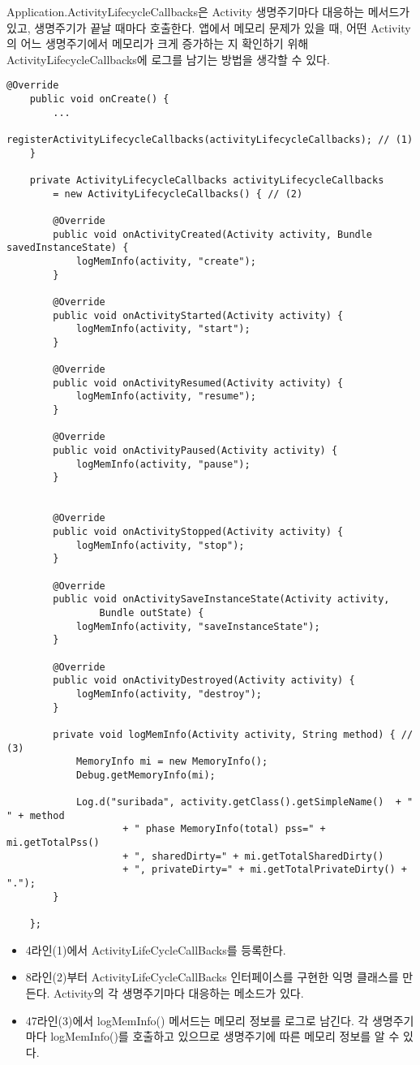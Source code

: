 Application.ActivityLifecycleCallbacks은 Activity 생명주기마다 대응하는 메서드가 있고, 생명주기가 끝날 때마다 호출한다.
앱에서 메모리 문제가 있을 때, 어떤 Activity의 어느 생명주기에서 메모리가 크게 증가하는 지 확인하기 위해 ActivityLifecycleCallbacks에 로그를 남기는 방법을 생각할 수 있다.
\begin{lstlisting}[frame=single] 
	@Override
	public void onCreate() {
		...
		registerActivityLifecycleCallbacks(activityLifecycleCallbacks); // (1)
	}
	
	private ActivityLifecycleCallbacks activityLifecycleCallbacks 
		= new ActivityLifecycleCallbacks() { // (2)
		
		@Override
		public void onActivityCreated(Activity activity, Bundle savedInstanceState) {
			logMemInfo(activity, "create");
		}
		
		@Override
		public void onActivityStarted(Activity activity) {
			logMemInfo(activity, "start");
		}
		
		@Override
		public void onActivityResumed(Activity activity) {
			logMemInfo(activity, "resume");
		}
		
		@Override
		public void onActivityPaused(Activity activity) {
			logMemInfo(activity, "pause");
		}

		
		@Override
		public void onActivityStopped(Activity activity) {
			logMemInfo(activity, "stop");
		}
		
		@Override
		public void onActivitySaveInstanceState(Activity activity, 
				Bundle outState) {
			logMemInfo(activity, "saveInstanceState");
		}
		
		@Override
		public void onActivityDestroyed(Activity activity) {
			logMemInfo(activity, "destroy");
		}
		
		private void logMemInfo(Activity activity, String method) { // (3)
			MemoryInfo mi = new MemoryInfo(); 
			Debug.getMemoryInfo(mi);
			
			Log.d("suribada", activity.getClass().getSimpleName()  + " " + method 
					+ " phase MemoryInfo(total) pss=" + mi.getTotalPss() 
					+ ", sharedDirty=" + mi.getTotalSharedDirty() 
					+ ", privateDirty=" + mi.getTotalPrivateDirty() + "."); 
		}
	
	};
\end{lstlisting}
\begin{itemize}
\item 4라인(1)에서 ActivityLifeCycleCallBacks를 등록한다.
\item 8라인(2)부터 ActivityLifeCycleCallBacks 인터페이스를 구현한 익명 클래스를 만든다. Activity의 각 생명주기마다 대응하는 메소드가 있다.
\item 47라인(3)에서 logMemInfo() 메서드는 메모리 정보를 로그로 남긴다. 각 생명주기마다 logMemInfo()를 호출하고 있으므로 생명주기에 따른 메모리 정보를 알 수 있다.
\end{itemize}

